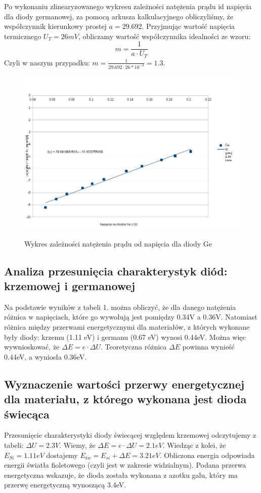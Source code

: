 \documentclass{article}
\begin{document}
Po wykonaniu zlinearyzowanego wykresu zależności natężenia prądu id napięcia dla diody germanowej, za pomocą arkusza kalkulacyjnego obliczyliśmy, że współczynnik kierunkowy prostej $a = 29.692$. Przyjmując wartość napięcia termicznego $U_{T} = 26mV$, obliczamy wartość współczynnika idealności ze wzoru:
\begin{equation}
	m = \frac{1}{a \cdot U_{T}} 
\end{equation}
Czyli w naszym przypadku: $m = \frac{1}{29.692 \cdot 26*10^{-3}}  = 1.3$.
\begin{figure}[h!]
	\centering
	\includegraphics[scale=0.3]{ch02new}
	\label{fig:ch02new}
	\caption{Wykres zależności natężenia prądu od napięcia dla diody Ge}
\end{figure}

\subsection{Analiza przesunięcia charakterystyk diód: krzemowej i germanowej}
Na podstawie wyników z tabeli 1. można obliczyć, że dla danego natężenia różnica w napięciach, które go wywołują jest pomiędzy 0.34V a 0.36V. Natomiast różnica między przerwami energetycznymi dla materiałów, z których wykonane były diody: krzemu (1.11 eV) i germanu (0.67 eV) wynosi 0.44eV.\newline
Można więc wywnioskować, że $\Delta E = e \cdot \Delta U$. Teoretyczna różnica $\Delta E$ powinna wynieść 0.44eV, a wyniosła 0.36eV.

\subsection{Wyznaczenie wartości przerwy energetycznej dla materiału, z którego wykonana jest dioda świecąca}
Przesunięcie charakterystyki diody świecącej względem krzemowej odczytujemy z tabeli: $\Delta U = 2.3 V$.
Wiemy, że $\Delta E = e \cdot \Delta U = 2.1eV$. Wiedząc z kolei, że $E_{Si} = 1.11 eV$ dostajemy $E_{św} = E_{si} + \Delta E = 3.21 eV	$.
Obliczona energia odpowiada energii światła fioletowego (czyli jest w zakresie widzialnym). Podana przerwa energetyczna wskazuje, że dioda została wykonana z azotku galu, który ma przerwę energetyczną wynoszącą 3.4eV.
\end{document}
